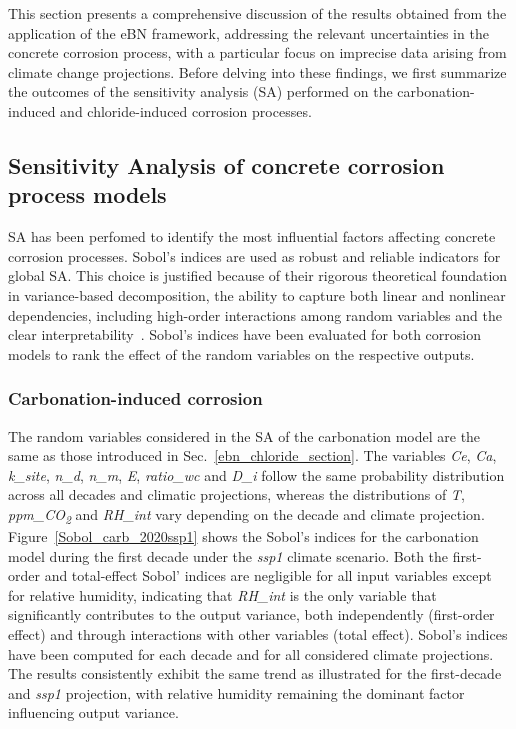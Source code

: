 
This section presents a comprehensive discussion of the results obtained from the application of the eBN framework, addressing the relevant uncertainties in the concrete corrosion process, with a particular focus on imprecise data arising from climate change projections. Before delving into these findings, we first summarize the outcomes of the sensitivity analysis (SA) performed on the carbonation-induced and chloride-induced corrosion processes.

\subsection{Sensitivity Analysis of concrete corrosion process models}
SA has been perfomed to identify the most influential factors affecting concrete corrosion processes.
Sobol's indices are used as robust and reliable indicators for global SA. 
This choice is justified because of their rigorous theoretical foundation in variance-based decomposition, the ability to capture both linear and nonlinear dependencies, including high-order interactions among random variables and the clear interpretability~\cite{Sobols_indices_SOBOL}.
Sobol's indices have been evaluated for both corrosion models to rank the effect of the random variables on the respective outputs. 

\subsubsection{Carbonation-induced corrosion}\label{SA_carbonation}
The random variables considered in the SA of the carbonation model are the same as those introduced in Sec.~\ref{ebn_chloride_section}. 
The variables \textit{Ce}, \textit{Ca}, \textit{k\_site}, \textit{n\_d}, \textit{n\_m}, \textit{E}, \textit{ratio\_wc} and \textit{D\_i} follow the same probability distribution across all decades and climatic projections, whereas the distributions of \textit{T}, \textit{ppm\_CO\textsubscript{2}} and \textit{RH\_int} vary depending on the decade and climate projection. \\ 
Figure~\ref{Sobol_carb_2020ssp1} shows the Sobol's indices for the carbonation model during the first decade under the \textit{ssp1} climate scenario. 
Both the first-order and total-effect Sobol' indices are negligible for all input variables except for relative humidity, indicating that \textit{RH\_int} is the only variable that significantly contributes to the output variance, both independently (first-order effect) and through interactions with other variables (total effect).
Sobol's indices have been computed for each decade and for all considered climate projections. The results consistently exhibit the same trend as illustrated for the first-decade and \textit{ssp1} projection, with relative humidity remaining the dominant factor influencing output variance. 

